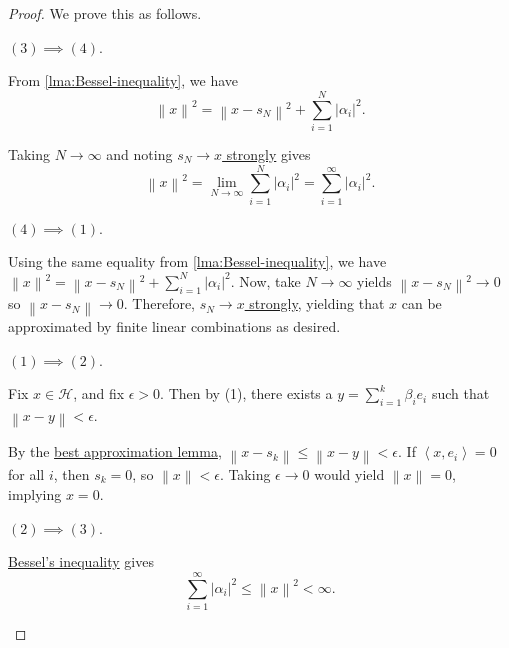 \begin{proof}
	We prove this as follows.
	\begin{claim}
		\((3)\implies(4)\).
	\end{claim}
	\begin{explanation}
		From \autoref{lma:Bessel-inequality}, we have
		\[
			\left\lVert x\right\rVert^2 = \left\lVert x - s_N\right\rVert^2 + \sum_{i=1}^N \left\vert \alpha_i \right\vert ^2.
		\]

		Taking \(N \to \infty\) and noting \hyperref[def:strong-convergence]{\(s_N \to x\) strongly} gives
		\[
			\left\lVert x\right\rVert^2 = \lim_{N \to \infty} \sum_{i=1}^N \left\vert \alpha_i \right\vert ^2 = \sum_{i=1}^\infty \left\vert \alpha_i \right\vert ^2.
		\]
	\end{explanation}

	\begin{claim}
		\((4)\implies (1)\).
	\end{claim}
	\begin{explanation}
		Using the same equality from \autoref{lma:Bessel-inequality}, we have \(\left\lVert x\right\rVert^2 = \left\lVert x - s_N\right\rVert^2 + \sum_{i=1}^N \left\vert \alpha_i \right\vert ^2\).
		Now, take \(N \to \infty\) yields \(\left\lVert x - s_N\right\rVert^2 \to 0\) so \(\left\lVert x - s_N\right\rVert \to 0\).
		Therefore, \hyperref[def:strong-convergence]{\(s_N \to x\) strongly}, yielding that \(x\) can be approximated by finite linear combinations as desired.
	\end{explanation}
	\begin{claim}
		\((1) \implies (2)\).
	\end{claim}
	\begin{explanation}
		Fix \(x \in \mathcal{H}\), and fix \(\epsilon > 0\). Then by (1), there exists a \(y = \sum_{i=1}^k \beta_i e_i\) such that \(\left\lVert x - y\right\rVert < \epsilon\).

		By the \hyperref[lma:best-approximation]{best approximation lemma}, \(\left\lVert x - s_k\right\rVert \leq \left\lVert x - y\right\rVert < \epsilon \).
		If \(\left< x,e_i \right> = 0\) for all \(i\), then \(s_k = 0\), so \(\left\lVert x\right\rVert < \epsilon \).
		Taking \(\epsilon \to 0\) would yield \(\left\lVert x\right\rVert = 0\), implying \(x = 0\).
	\end{explanation}

	\begin{claim}
		\((2)\implies (3)\).
	\end{claim}
	\begin{explanation}
		\hyperref[lma:Bessel-inequality]{Bessel's inequality} gives
		\[
			\sum_{i=1}^\infty \left\vert \alpha_i \right\vert ^2 \leq \left\lVert x\right\rVert^2 < \infty.
		\]


\end{explanation}
\end{proof}

